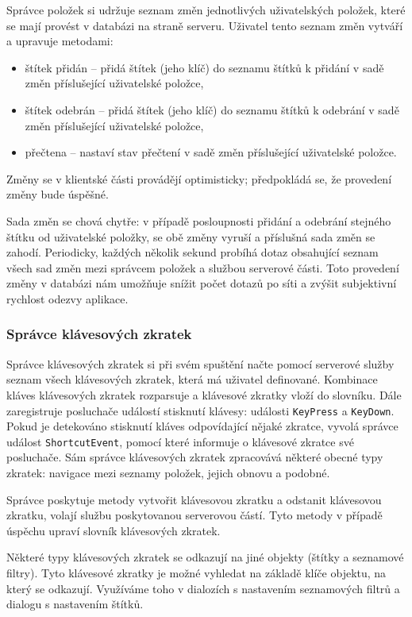 Správce položek si udržuje seznam změn jednotlivých uživatelských položek, které se mají provést v databázi na straně serveru.
Uživatel tento seznam změn vytváří a upravuje metodami:
\begin{itemize}
	\item štítek přidán -- přidá štítek (jeho klíč) do seznamu štítků k přidání v sadě změn příslušející uživatelské položce,
	\item štítek odebrán -- přidá štítek (jeho klíč) do seznamu štítků k odebrání v sadě změn příslušející uživatelské položce,
	\item přečtena -- nastaví stav přečtení v sadě změn příslušející uživatelské položce.
\end{itemize}
Změny se v klientské části provádějí optimisticky; předpokládá se, že provedení změny bude úspěšné.

Sada změn se chová chytře: v případě posloupnosti přidání a odebrání stejného štítku od uživatelské položky, se obě změny vyruší a příslušná sada změn se zahodí.
Periodicky, každých několik sekund probíhá dotaz obsahující seznam všech sad změn mezi správcem položek a službou serverové části.
Toto  provedení změny v databázi nám umožňuje snížit počet dotazů po síti a zvýšit subjektivní rychlost odezvy aplikace.

\subsubsection{Správce klávesových zkratek}

Správce klávesových zkratek si při svém spuštění načte pomocí serverové služby seznam všech klávesových zkratek, která má uživatel definované.
Kombinace kláves klávesových zkratek rozparsuje a klávesové zkratky vloží do slovníku.
Dále zaregistruje posluchače událostí stisknutí klávesy: události \verb|KeyPress| a \verb|KeyDown|.
Pokud je detekováno stisknutí kláves odpovídající nějaké zkratce, vyvolá správce událost \verb|ShortcutEvent|, pomocí které informuje o klávesové zkratce své posluchače.
Sám správce klávesových zkratek zpracovává některé obecné typy zkratek: navigace mezi seznamy položek, jejich obnovu a podobné.

Správce poskytuje metody vytvořit klávesovou zkratku a odstanit klávesovou zkratku, volají službu poskytovanou serverovou částí.
Tyto metody v případě úspěchu upraví slovník klávesových zkratek.

Některé typy klávesových zkratek se odkazují na jiné objekty (štítky a seznamové filtry).
Tyto klávesové zkratky je možné vyhledat na základě klíče objektu, na který se odkazují.
Využíváme toho v dialozích s nastavením seznamových filtrů a dialogu s nastavením štítků.

